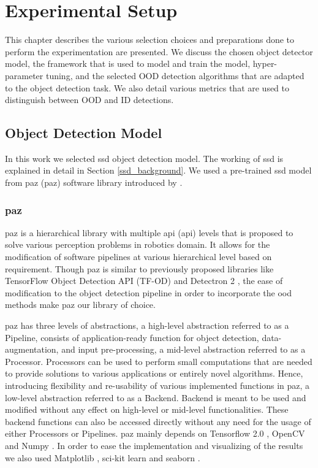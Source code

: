 

    \justifying
    \chapter{Experimental Setup}
    This chapter describes the various selection choices and preparations done to perform the experimentation are presented. We discuss the chosen object detector model, the framework that is used to model and train the model, hyper-parameter tuning, and the selected OOD detection algorithms that are adapted to the object detection task. We also detail various metrics that are used to distinguish between OOD and ID detections.
    
    \section{Object Detection Model}
    In this work we selected \acrshort{ssd} \cite{Liu2016SSDSS} object detection model. The working of \acrshort{ssd} is explained in detail in Section \ref{ssd_background}. We used a pre-trained \acrshort{ssd} model from \acrlong{paz} (\acrshort{paz}) software library introduced by \citet{arriaga2020perception}.
    
    \subsection{\acrlong{paz}}
    \label{paz}
    \acrshort{paz} is a hierarchical library with multiple \acrlong{api} (\acrshort{api}) levels that is proposed to solve various perception problems in robotics domain. It allows for the modification of software pipelines at various hierarchical level based on requirement. Though \acrshort{paz} is similar to previously proposed libraries like TensorFlow Object Detection API (TF-OD) \cite{Huang2017} and Detectron 2 \cite{wu2019detectron2}, the ease of modification to the object detection pipeline in order to incorporate the \acrshort{ood} methods make \acrshort{paz} our library of choice. 
    
    \acrshort{paz} has three levels of abstractions, a high-level abstraction referred to as a Pipeline, consists of application-ready function for object detection, data-augmentation, and input pre-processing, a mid-level abstraction referred to as a Processor. Processors can be used to perform small computations that are needed to provide solutions to various applications or entirely novel algorithms. Hence, introducing flexibility and re-usability of various implemented functions in \acrshort{paz}, a low-level abstraction referred to as a Backend. Backend is meant to be used and modified without any effect on high-level or mid-level functionalities. These backend functions can also be accessed directly without any need for the usage of either Processors or Pipelines. \acrshort{paz} mainly depends on Tensorflow 2.0 \cite{Abadi2016}, OpenCV \cite{opencv} and Numpy \cite{numpy}. In order to ease the implementation and visualizing of the results we also used Matplotlib \cite{Hunter2007}, sci-kit learn \cite{scikit-learn} and seaborn \cite{Waskom2021}.
    
